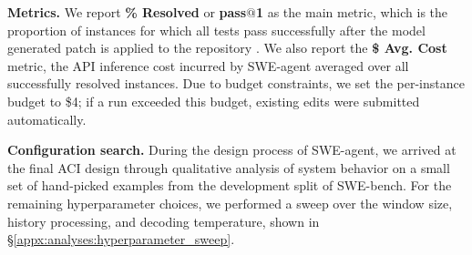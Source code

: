 \textbf{Metrics.} We report \textbf{\% Resolved} or \textbf{pass$@$\num{1}} as the main metric, which is the proportion of instances for which all tests pass successfully after the model generated patch is applied to the repository \citep{jimenez2024swebench}.
We also report the \textbf{\$ Avg. Cost} metric, the API inference cost incurred by SWE-agent averaged over all successfully resolved instances.
Due to budget constraints, we set the per-instance budget to \$4;
if a run exceeded this budget, existing edits were submitted automatically.

\textbf{Configuration search.}
During the design process of SWE-agent, we arrived at the final ACI design through qualitative analysis of system behavior on a small set of hand-picked examples from the development split of SWE-bench.
For the remaining hyperparameter choices, we performed a sweep over the window size, history processing, and decoding temperature, shown in \S\ref{appx:analyses:hyperparameter_sweep}.
